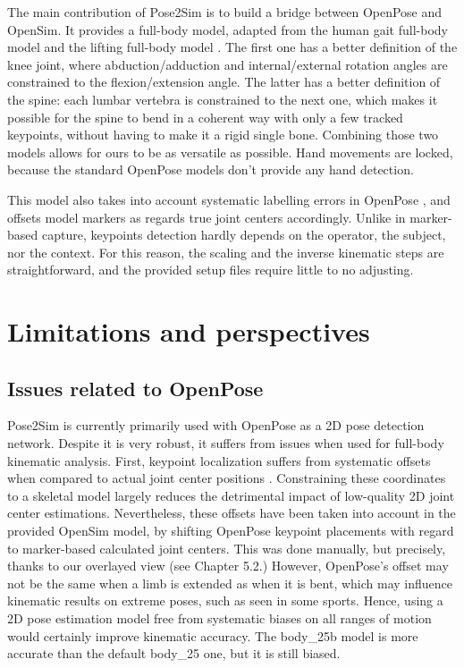 The main contribution of Pose2Sim is to build a bridge between OpenPose and OpenSim. It provides a full-body model, adapted from the human gait full-body model \cite{Rajagopal2016} and the lifting full-body model \cite{Beaucage-Gauvreau2019}. The first one has a better definition of the knee joint, where abduction/adduction and internal/external rotation angles are constrained to the flexion/extension angle. The latter has a better definition of the spine: each lumbar vertebra is constrained to the next one, which makes it possible for the spine to bend in a coherent way with only a few tracked keypoints, without having to make it a rigid single bone. Combining those two models allows for ours to be as versatile as possible. Hand movements are locked, because the standard OpenPose models don't provide any hand detection.

This model also takes into account systematic labelling errors in OpenPose \cite{Needham2021b}, and offsets model markers as regards true joint centers accordingly. Unlike in marker-based capture, keypoints detection hardly depends on the operator, the subject, nor the context. For this reason, the scaling and the inverse kinematic steps are straightforward, and the provided setup files require little to no adjusting.


\section{Limitations and perspectives}

\subsection{Issues related to OpenPose}

Pose2Sim is currently primarily used with OpenPose as a 2D pose detection network. Despite it is very robust, it suffers from issues when used for full-body kinematic analysis. First, keypoint localization suffers from systematic offsets when compared to actual joint center positions \cite{Needham2021b}. Constraining these coordinates to a skeletal model largely reduces the detrimental impact of low-quality 2D joint center estimations. Nevertheless, these offsets have been taken into account in the provided OpenSim model, by shifting OpenPose keypoint placements with regard to marker-based calculated joint centers. This was done manually, but precisely, thanks to our overlayed view (see  Chapter 5.2.) However, OpenPose’s offset may not be the same when a limb is extended as when it is bent, which may influence kinematic results on extreme poses, such as seen in some sports. Hence, using a 2D pose estimation model free from systematic biases on all ranges of motion would certainly improve kinematic accuracy. The body\_25b model is more accurate than the default body\_25 one, but it is still biased. 

